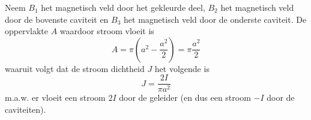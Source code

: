 

\begin{description}[labelwidth=1.5cm, leftmargin=!]
    \item[Opl. :]  
    
        Neem $B_1$ het magnetisch veld door het gekleurde deel, $B_2$ het magnetisch veld door de bovenste caviteit en $B_3$ het magnetisch veld door de onderste caviteit.
        De oppervlakte $A$ waardoor stroom vloeit is
        \begin{equation*}
            A = \pi\left(a^2 - \frac{a^2}{2}\right) = \pi\frac{a^2}{2}
        \end{equation*}
        waaruit volgt dat de stroom dichtheid $J$ het volgende is
        \begin{equation*}
            J = \frac{2I}{\pi a^2}
        \end{equation*}
        m.a.w. er vloeit een stroom $2I$ door de geleider (en dus een stroom $-I$ door de caviteiten). \\
        

\end{description}
